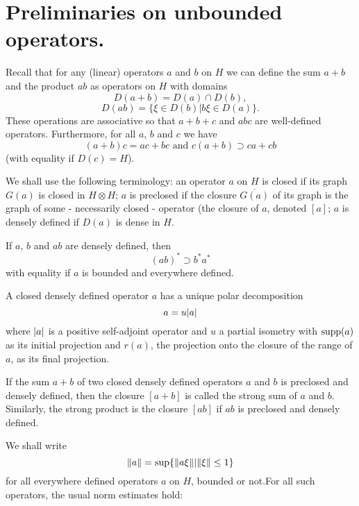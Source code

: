 \section*{Preliminaries on unbounded operators.}\par
Recall that for any (linear) operators $a$ and $b$ on $H$ we can define the sum $a+b$ and the product $ab$ as operators on $H$ with domains
\begin{equation}
    D(a+b)=D(a)\cap D(b),
\end{equation}
\begin{equation}
    D(ab)=\{\xi\in D(b)|b\xi\in D(a)\}.
\end{equation}
These operations are associative so that $a+b+c$ and $abc$ are well-defined operators. Furthermore, for all $a$, $b$ and $c$ we have
\begin{equation}
    (a+b)c = ac + bc \text{ and } c(a+b)\supset ca + cb
\end{equation}
(with equality if $D(c)=H$).\par
We shall use the following terminology: an operator $a$ on $H$ is closed if its graph $G(a)$ is closed in $H\otimes H$; $a$ is preclosed if the closure $\overline{G(a)}$ of its graph is the graph of some - necessarily closed - operator (the closure of $a$, denoted $[a]$; $a$ is densely defined if $D(a)$ is dense in $H$.\par
If $a$, $b$ and $ab$ are densely defined, then
\begin{equation}
    (ab)^*\supset b^*a^*
\end{equation}
with equality if $a$ is bounded and everywhere defined.\par
A closed densely defined operator $a$ has a unique polar decomposition
\begin{equation}
    a = u\abs{a}
\end{equation}
where $\abs{a}$ is a positive self-adjoint operator and $u$ a partial isometry with $\operatorname{supp}(a)$ as its initial projection and $r(a)$, the projection onto the closure of the range of $a$, as its final projection.\par
If the sum $a+b$ of two closed densely defined operators $a$ and $b$ is preclosed and densely defined, then the closure $[a+b]$ is called the strong sum of $a$ and $b$. Similarly, the strong product is the closure $[ab]$ if $ab$ is preclosed and densely defined.\par
We shall write
\[
    \norm{a}=\sup\{\norm{a\xi}| \norm{\xi}\leq 1\}  
\]
for all everywhere defined operators $a$ on $H$, bounded or not.For all such operators, the usual norm estimates hold:
